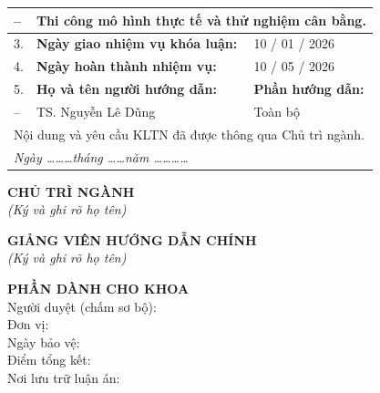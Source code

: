 \documentclass[12pt,a4paper,oneside]{extbook}
\begin{document}
{{\begin{tabular}{|p{}|p{}|p{}|p{}|p{}|}
\hline
-- & \multicolumn{4}{l|}{Thi công mô hình thực tế và thử nghiệm cân bằng.} \\
\hline
3. & \multicolumn{2}{l|}{\textbf{Ngày giao nhiệm vụ khóa luận:}} &
\multicolumn{2}{l|}{10 / 01 / 2026} \\
\hline
4. & \multicolumn{2}{l|}{\textbf{Ngày hoàn thành nhiệm vụ:}} &
\multicolumn{2}{l|}{10 / 05 / 2026} \\
\hline
5. & \multicolumn{3}{l|}{\textbf{Họ và tên người hướng dẫn:}} &
\textbf{Phần hướng dẫn:} \\
-- & \multicolumn{3}{l|}{TS. Nguyễn Lê Dũng} & Toàn bộ \\

\hline
\multicolumn{5}{|l|}{Nội dung và yêu cầu KLTN đã được thông qua Chủ trì ngành.} \\
\multicolumn{5}{|l|}{\textit{\hspace{1cm}Ngày \dots\dots\dots tháng \dots\dots năm \dots\dots\dots\dots}} \\
\hline
\end{tabular}
\renewcommand{\arraystretch}{1.0}}
}

\vspace{0.1cm}
\noindent
\begin{minipage}[t]{0.45\textwidth}
    \centering
    \textbf{CHỦ TRÌ NGÀNH} \\[0.1cm]
    \textit{(Ký và ghi rõ họ tên)}
\end{minipage}%
\hfill
\begin{minipage}[t]{0.45\textwidth}
    \centering
    \textbf{GIẢNG VIÊN HƯỚNG DẪN CHÍNH} \\[0.1cm]
    \textit{(Ký và ghi rõ họ tên)}
\end{minipage}

\vspace{2cm}

\noindent\textbf{PHẦN DÀNH CHO KHOA} \\[0.1cm]
Người duyệt (chấm sơ bộ): \dotfill \\
Đơn vị: \dotfill \\
Ngày bảo vệ: \dotfill \\
Điểm tổng kết: \dotfill \\
Nơi lưu trữ luận án: \dotfill

\clearpage


\frontmatter
\end{document}
